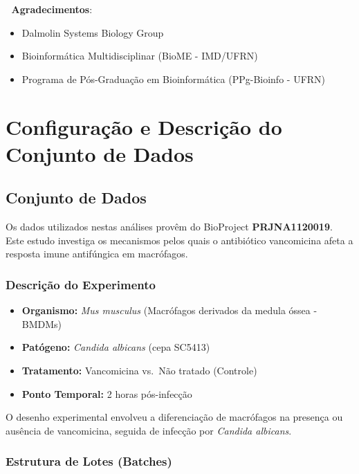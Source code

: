 \documentclass[
  letterpaper,
  DIV=11,
  numbers=noendperiod]{scrreprt}
\providecommand{\tightlist}{%
  \setlength{\itemsep}{0pt}\setlength{\parskip}{0pt}}
\begin{document}
🙏 \textbf{Agradecimentos}:

\begin{itemize}
\tightlist
\item
  Dalmolin Systems Biology Group
\item
  Bioinformática Multidisciplinar (BioME - IMD/UFRN)
\item
  Programa de Pós-Graduação em Bioinformática (PPg-Bioinfo - UFRN)
\end{itemize}


\chapter{Configuração e Descrição do Conjunto de
Dados}\label{configurauxe7uxe3o-e-descriuxe7uxe3o-do-conjunto-de-dados}

\section{Conjunto de Dados}\label{conjunto-de-dados}

Os dados utilizados nestas análises provêm do BioProject
\textbf{PRJNA1120019}. Este estudo investiga os mecanismos pelos quais o
antibiótico vancomicina afeta a resposta imune antifúngica em
macrófagos.

\subsection{Descrição do
Experimento}\label{descriuxe7uxe3o-do-experimento}

\begin{itemize}
\tightlist
\item
  \textbf{Organismo:} \emph{Mus musculus} (Macrófagos derivados da
  medula óssea - BMDMs)
\item
  \textbf{Patógeno:} \emph{Candida albicans} (cepa SC5413)
\item
  \textbf{Tratamento:} Vancomicina vs.~Não tratado (Controle)
\item
  \textbf{Ponto Temporal:} 2 horas pós-infecção
\end{itemize}

O desenho experimental envolveu a diferenciação de macrófagos na
presença ou ausência de vancomicina, seguida de infecção por
\emph{Candida albicans}.

\subsection{Estrutura de Lotes
(Batches)}\label{estrutura-de-lotes-batches}
\end{document}
